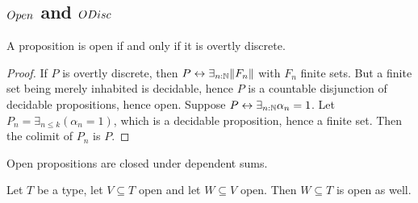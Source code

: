 
\subsection{$\Open$ and $\ODisc$} %
\begin{lemma}\label{PropOpenIffOdisc}
  A proposition is open if and only if it is overtly discrete.
\end{lemma}
\begin{proof}
  If $P$ is overtly discrete, then $P\leftrightarrow \exists_{n:\mathbb{N}} \lVert F_n \rVert$ with $F_n$ finite sets. 
  But a finite set being merely inhabited is decidable, hence $P$ is a countable disjunction of decidable propositions, hence open.
  Suppose $P\leftrightarrow \exists_{n:\mathbb{N}} \alpha_n = 1$. 
  Let $P_n = \exists_{n\leq k} (\alpha_n = 1)$, which is a decidable proposition, hence a finite set. 
  Then the colimit of $P_n$ is $P$. 
\end{proof}

\begin{corollary}\label{OpenDependentSums}
  Open propositions are closed under dependent sums. 
\end{corollary}
\begin{corollary}\label{OpenTransitive}
  Let $T$ be a type, let $V\subseteq T$ open and let $W\subseteq V$ open. 
  Then $W\subseteq T$ is open as well. 
\end{corollary}

